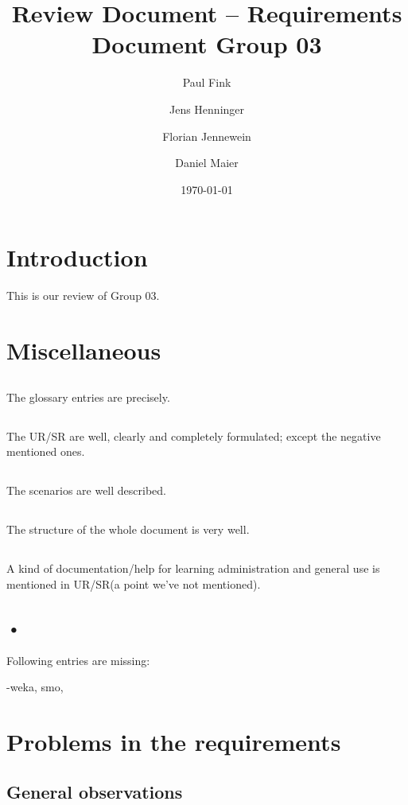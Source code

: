 \documentclass{article}
\title{Review Document -- Requirements Document Group 03}
\author{Paul Fink \and Jens Henninger \and Florian Jennewein \and Daniel Maier}
\date{\today}
\begin{document}
\maketitle

\section{Introduction}
This is our review of Group 03. 

\section{Miscellaneous}

\subsection{}
The glossary entries are precisely.
\subsection{}
The UR/SR are well, clearly and completely formulated; except the negative mentioned ones.
\subsection{}
The scenarios are well described.
\subsection{}
The structure of the whole document is very well.
\subsection{}
A kind of documentation/help for learning administration and general use is mentioned in UR/SR(a point we’ve not mentioned).	 
\subsection{•}
Following entries are missing: \par -weka, smo, 

 
\section{Problems in the requirements}

\subsection{General observations}
\end{document}
